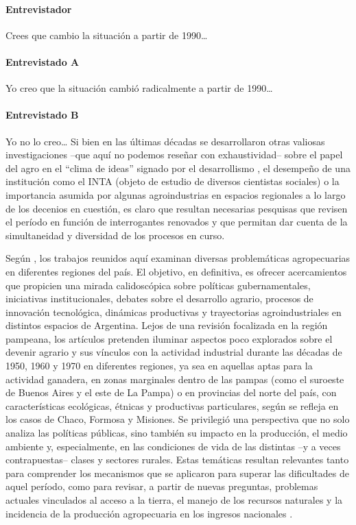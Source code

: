 \paragraph{Entrevistador} Crees que cambio la situación a partir de 1990…

\paragraph{Entrevistado A} Yo creo que la situación cambió radicalmente a partir de 1990…

\paragraph{Entrevistado B} Yo no lo creo…
Si bien en las últimas décadas se desarrollaron otras valiosas investigaciones –que aquí no podemos reseñar con exhaustividad– sobre el papel del agro en el “clima de ideas” signado por el desarrollismo \autocite{2835-TEOBALDO1946,2843-NELSON1912,2844-MERCANTE1908}, el desempeño de una institución como el INTA (objeto de estudio de diversos cientistas sociales) o la importancia asumida por algunas agroindustrias en espacios regionales a lo largo de los decenios en cuestión, es claro que resultan necesarias pesquisas que revisen el período en función de interrogantes renovados y que permitan dar cuenta de la simultaneidad y diversidad de los procesos en curso.

Según \textcite{2850-GONZALEZLEANDRI2006}, los trabajos reunidos aquí examinan diversas problemáticas agropecuarias en diferentes regiones del país. El objetivo, en definitiva, es ofrecer acercamientos que propicien una mirada calidoscópica sobre políticas gubernamentales, iniciativas institucionales, debates sobre el desarrollo agrario, procesos de innovación tecnológica, dinámicas productivas y trayectorias agroindustriales en distintos espacios de Argentina. Lejos de una revisión focalizada en la región pampeana, los artículos pretenden iluminar aspectos poco explorados sobre el devenir agrario y sus vínculos con la actividad industrial durante las décadas de 1950, 1960 y 1970 en diferentes regiones, ya sea en aquellas aptas para la actividad ganadera, en zonas marginales dentro de las pampas (como el suroeste de Buenos Aires y el este de La Pampa) o en provincias del norte del país, con características ecológicas, étnicas y productivas particulares, según se refleja en los casos de Chaco, Formosa y Misiones. Se privilegió una perspectiva que no solo analiza las políticas públicas, sino también su impacto en la producción, el medio ambiente y, especialmente, en las condiciones de vida de las distintas –y a veces contrapuestas– clases y sectores rurales. Estas temáticas resultan relevantes tanto para comprender los mecanismos que se aplicaron para superar las dificultades de aquel período, como para revisar, a partir de nuevas preguntas, problemas actuales vinculados al acceso a la tierra, el manejo de los recursos naturales y la incidencia de la producción agropecuaria en los ingresos nacionales \autocite[véase][pp. 45-48 para una discusión más extensa]{2850-GONZALEZLEANDRI2006}.


